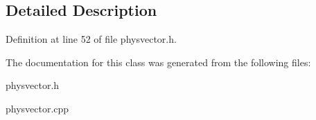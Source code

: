 \subsection{Detailed Description}


Definition at line 52 of file physvector.h.

The documentation for this class was generated from the following files:\begin{DoxyCompactItemize}
\item 
physvector.h\item 
physvector.cpp\end{DoxyCompactItemize}
